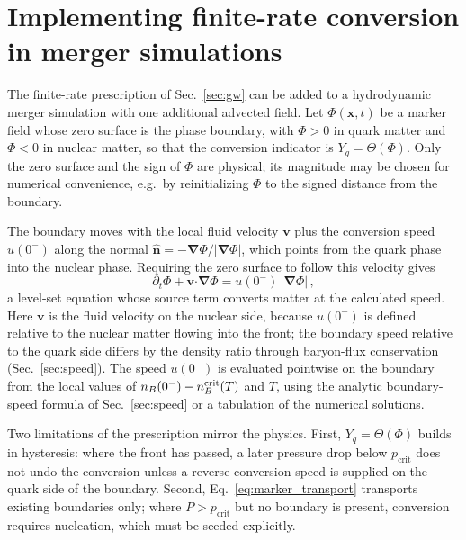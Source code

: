 
\section{Implementing finite-rate conversion in merger simulations}
\label{sec:finite_rate_implementation}

The finite-rate prescription of Sec.~\ref{sec:gw} can be added to a hydrodynamic merger simulation with one additional advected field.
Let $\Phi(\boldsymbol{x},t)$ be a marker field whose zero surface is the phase boundary, with $\Phi>0$ in quark matter and $\Phi<0$ in nuclear matter, so that the conversion indicator is $Y_q=\Theta(\Phi)$.
Only the zero surface and the sign of $\Phi$ are physical; its magnitude may be chosen for numerical convenience, e.g.\ by reinitializing $\Phi$ to the signed distance from the boundary.

The boundary moves with the local fluid velocity $\boldsymbol{v}$ plus the conversion speed $u(0^-)$ along the normal $\widehat{\boldsymbol{n}}=-\boldsymbol{\nabla}\Phi/|\boldsymbol{\nabla}\Phi|$, which points from the quark phase into the nuclear phase.
Requiring the zero surface to follow this velocity gives
\begin{equation}
\partial_t\Phi
+\boldsymbol{v}\boldsymbol{\cdot}\boldsymbol{\nabla}\Phi
=u(0^-)\,\bigl|\boldsymbol{\nabla}\Phi\bigr|\,,
\label{eq:marker_transport}
\end{equation}
a level-set equation whose source term converts matter at the calculated speed.
Here $\boldsymbol{v}$ is the fluid velocity on the nuclear side, because $u(0^-)$ is defined relative to the nuclear matter flowing into the front; the boundary speed relative to the quark side differs by the density ratio through baryon-flux conservation (Sec.~\ref{sec:speed}).
The speed $u(0^-)$ is evaluated pointwise on the boundary from the local values of $n_B(0^-)-n_B^{\rm crit}(T)$ and $T$, using the analytic boundary-speed formula of Sec.~\ref{sec:speed} or a tabulation of the numerical solutions.

Two limitations of the prescription mirror the physics.
First, $Y_q=\Theta(\Phi)$ builds in hysteresis: where the front has passed, a later pressure drop below $p_\text{crit}$ does not undo the conversion unless a reverse-conversion speed is supplied on the quark side of the boundary.
Second, Eq.~\eqref{eq:marker_transport} transports existing boundaries only; where $P>p_\text{crit}$ but no boundary is present, conversion requires nucleation, which must be seeded explicitly.
